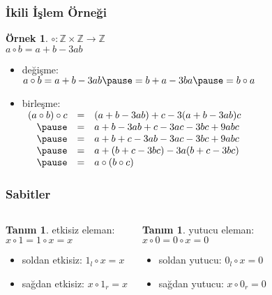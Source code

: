 \documentclass[dvipsnames]{beamer}
\theoremstyle{definition}
\newtheorem{tanim}[theorem]{Tanım}
\theoremstyle{example}
\newtheorem{ornek}[theorem]{Örnek}
\theoremstyle{plain}
\begin{document}
\begin{frame}
  \frametitle{İkili İşlem Örneği}

  \begin{ornek}
    $\circ: \mathbb{Z} \times \mathbb{Z} \rightarrow \mathbb{Z}$\\
    $a \circ b = a + b - 3ab$

    \pause
    \medskip
    \begin{itemize}
      \item değişme:\\
        $a \circ b = a + b - 3ab \pause
                   = b + a - 3ba \pause
                   = b \circ a$

      \pause
      \medskip
      \item birleşme:\\
        $\begin{array}{rcl}
          (a \circ b) \circ c & = & (a + b - 3ab) + c - 3 (a + b - 3ab) c\\ \pause
                              & = & a + b - 3ab + c - 3ac - 3bc + 9abc\\ \pause
                              & = & a + b + c - 3ab - 3ac - 3bc + 9abc\\ \pause
                              & = & a + (b + c - 3bc) - 3 a (b + c - 3bc)\\ \pause
                              & = & a \circ (b \circ c)
        \end{array}$
     \end{itemize}
 \end{ornek}
\end{frame}

\begin{frame}
  \frametitle{Sabitler}

  \begin{columns}
    \begin{tanim}
      \alert{etkisiz eleman}:\\
      $x \circ 1 = 1 \circ x = x$

      \begin{itemize}
        \item soldan etkisiz: $1_l \circ x = x$
        \item sağdan etkisiz: $x \circ 1_r = x$
      \end{itemize}
    \end{tanim}

    \pause
    \begin{tanim}
      \alert{yutucu eleman}:\\
      $x \circ 0 = 0 \circ x = 0$

      \begin{itemize}
        \item soldan yutucu: $0_l \circ x = 0$
        \item sağdan yutucu: $x \circ 0_r = 0$
      \end{itemize}
    \end{tanim}
  \end{columns}
\end{frame}
\end{document}
